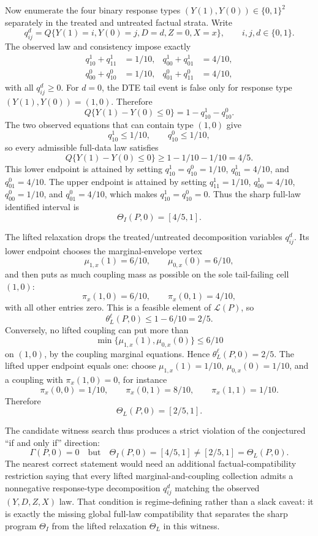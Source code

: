 Now enumerate the four binary response types \((Y(1),Y(0))\in\{0,1\}^2\) separately in the treated and untreated factual strata.  Write
\[
q^d_{ij}=Q\{Y(1)=i,Y(0)=j,D=d,Z=0,X=x\},
\qquad i,j,d\in\{0,1\}.
\]
The observed law and consistency impose exactly
\[
\begin{aligned}
q^1_{10}+q^1_{11}&=1/10, &
q^1_{00}+q^1_{01}&=4/10,\\
q^0_{00}+q^0_{10}&=1/10, &
q^0_{01}+q^0_{11}&=4/10,
\end{aligned}
\]
with all \(q^d_{ij}\ge0\).  For \(d=0\), the DTE tail event is false only for response type \((Y(1),Y(0))=(1,0)\).  Therefore
\[
Q\{Y(1)-Y(0)\le0\}=1-q^1_{10}-q^0_{10}.
\]
The two observed equations that can contain type \((1,0)\) give
\[
q^1_{10}\le 1/10,
\qquad
q^0_{10}\le 1/10,
\]
so every admissible full-data law satisfies
\[
Q\{Y(1)-Y(0)\le0\}\ge 1-1/10-1/10=4/5.
\]
This lower endpoint is attained by setting \(q^1_{10}=q^0_{10}=1/10\), \(q^1_{01}=4/10\), and \(q^0_{01}=4/10\).  The upper endpoint is attained by setting \(q^1_{11}=1/10\), \(q^1_{00}=4/10\), \(q^0_{00}=1/10\), and \(q^0_{01}=4/10\), which makes \(q^1_{10}=q^0_{10}=0\).  Thus the sharp full-law identified interval is
\[
\Theta_I(P,0)=[4/5,1].
\]

The lifted relaxation drops the treated/untreated decomposition variables \(q^d_{ij}\).  Its lower endpoint chooses the marginal-envelope vertex
\[
\mu_{1,x}(1)=6/10,\qquad \mu_{0,x}(0)=6/10,
\]
and then puts as much coupling mass as possible on the sole tail-failing cell \((1,0)\):
\[
\pi_x(1,0)=6/10,\qquad \pi_x(0,1)=4/10,
\]
with all other entries zero.  This is a feasible element of \(\mathcal L(P)\), so
\[
\theta_L^\ell(P,0)\le 1-6/10=2/5.
\]
Conversely, no lifted coupling can put more than
\[
\min\{\mu_{1,x}(1),\mu_{0,x}(0)\}\le 6/10
\]
on \((1,0)\), by the coupling marginal equations.  Hence \(\theta_L^\ell(P,0)=2/5\).  The lifted upper endpoint equals one: choose \(\mu_{1,x}(1)=1/10\), \(\mu_{0,x}(0)=1/10\), and a coupling with \(\pi_x(1,0)=0\), for instance
\[
\pi_x(0,0)=1/10,\qquad \pi_x(0,1)=8/10,\qquad \pi_x(1,1)=1/10.
\]
Therefore
\[
\Theta_L(P,0)=[2/5,1].
\]

The candidate witness search thus produces a strict violation of the conjectured ``if and only if'' direction:
\[
\Gamma(P,0)=0
\quad\text{but}\quad
\Theta_I(P,0)=[4/5,1]\ne[2/5,1]=\Theta_L(P,0).
\]
The nearest correct statement would need an additional factual-compatibility restriction saying that every lifted marginal-and-coupling collection admits a nonnegative response-type decomposition \(q^d_{ij}\) matching the observed \((Y,D,Z,X)\) law.  That condition is regime-defining rather than a slack caveat: it is exactly the missing global full-law compatibility that separates the sharp program \(\Theta_I\) from the lifted relaxation \(\Theta_L\) in this witness.
